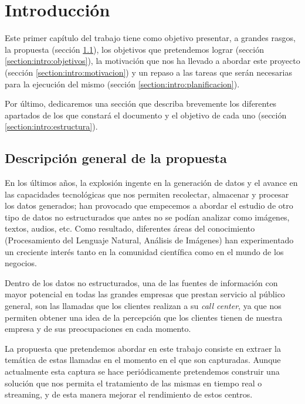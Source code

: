 \chapter{Introducción}
\label{chapter:introduccion}

Este primer capítulo del trabajo tiene como objetivo presentar, a grandes rasgos, la propuesta (sección \ref{section:intro:descripcion}), los objetivos que pretendemos lograr (sección \ref{section:intro:objetivos}), la motivación que nos ha llevado a abordar este proyecto (sección \ref{section:intro:motivacion}) y un repaso a las tareas que serán necesarias para la ejecución del mismo (sección \ref{section:intro:planificacion}). 

Por último, dedicaremos una sección que describa brevemente los diferentes apartados de los que constará el documento y el objetivo de cada uno (sección \ref{section:intro:estructura}).

\section{Descripción general de la propuesta}
\label{section:intro:descripcion}
En los últimos años, la explosión ingente en la generación de datos y el avance en las capacidades tecnológicas que nos permiten recolectar, almacenar y procesar los datos generados; han provocado que empecemos a abordar el estudio de otro tipo de datos no estructurados que antes no se podían analizar como imágenes, textos, audios, etc. Como resultado, diferentes áreas del conocimiento (Procesamiento del Lenguaje Natural, Análisis de Imágenes) han experimentado un creciente interés tanto en la comunidad científica como en el mundo de los negocios. 


Dentro de los datos no estructurados, una de las fuentes de información con mayor potencial en todas las grandes empresas que prestan servicio al público general, son las llamadas que los clientes realizan a su \textit{call center}, ya que nos permiten obtener una idea de la percepción que los clientes tienen de nuestra empresa y de sus preocupaciones en cada momento. 

La propuesta que pretendemos abordar en este trabajo consiste en extraer la temática de  estas llamadas en el momento en el que son capturadas. Aunque actualmente esta captura se hace periódicamente pretendemos construir una solución que nos permita el tratamiento de las mismas en tiempo real o streaming, y de esta manera mejorar el rendimiento de estos centros. %

